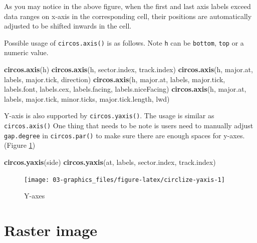 \documentclass[]{book}
\newenvironment{Shaded}{\begin{snugshade}}{\end{snugshade}}
\newcommand{\KeywordTok}[1]{\textcolor[rgb]{0.13,0.29,0.53}{\textbf{#1}}}
\newcommand{\NormalTok}[1]{#1}
\theoremstyle{definition}
\theoremstyle{definition}
\theoremstyle{remark}
\begin{document}
As you may notice in the above figure, when the first and last axis
labels exceed data ranges on x-axis in the corresponding cell, their
positions are automatically adjusted to be shifted inwards in the cell.

Possible usage of \texttt{circos.axis()} is as follows. Note \texttt{h}
can be \texttt{bottom}, \texttt{top} or a numeric value.

\begin{Shaded}
\begin{Highlighting}[]
\KeywordTok{circos.axis}\NormalTok{(h)}
\KeywordTok{circos.axis}\NormalTok{(h, sector.index, track.index)}
\KeywordTok{circos.axis}\NormalTok{(h, major.at, labels, major.tick, direction)}
\KeywordTok{circos.axis}\NormalTok{(h, major.at, labels, major.tick, labels.font, labels.cex,}
\NormalTok{            labels.facing, labels.niceFacing)}
\KeywordTok{circos.axis}\NormalTok{(h, major.at, labels, major.tick, minor.ticks,}
\NormalTok{            major.tick.length, lwd)}
\end{Highlighting}
\end{Shaded}

Y-axis is also supported by \texttt{circos.yaxis()}. The usage is
similar as \texttt{circos.axis()} One thing that needs to be note is
users need to manually adjust \texttt{gap.degree} in
\texttt{circos.par()} to make sure there are enough spaces for y-axes.
(Figure \ref{fig:circlize-yaxis})

\begin{Shaded}
\begin{Highlighting}[]
\KeywordTok{circos.yaxis}\NormalTok{(side)}
\KeywordTok{circos.yaxis}\NormalTok{(at, labels, sector.index, track.index)}
\end{Highlighting}
\end{Shaded}

\begin{figure}

{\centering \texttt{[image: 03-graphics\_files/figure-latex/circlize-yaxis-1]} 

}

\caption{Y-axes}\label{fig:circlize-yaxis}
\end{figure}

\section{Raster image}\label{raster-image}
\end{document}
